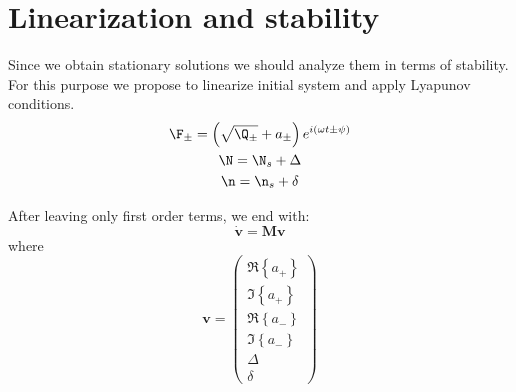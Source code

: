 \documentclass[12pt, notitlepage]{report}
\begin{document}
\section{Linearization and stability}
Since we obtain stationary solutions we should analyze them in terms of stability. For this purpose we propose to linearize initial system and apply Lyapunov conditions. 
\begin{gather}
	\F_\pm = \left(\sqrt{\Q_\pm}+a_\pm\right)e^{i(\omega t \pm \psi)} \\
	\N = \N_s + \Delta \\
	\n = \n_s + \delta
\end{gather}

After leaving only first order terms, we end with:
\newcommand{\bv}{\boldsymbol{v}}
\newcommand{\bM}{\boldsymbol{M}}
\begin{equation}
	\dot{\bv} = \bM\bv
\end{equation}
where
\begin{equation}
	\bv = \begin{pmatrix}
		\Re\left\{a_+\right\} \\
		\Im\left\{a_+\right\} \\
		\Re\left\{a_-\right\} \\
		\Im\left\{a_-\right\} \\
		\Delta \\
		\delta
	\end{pmatrix}
\end{equation}
\end{document}
